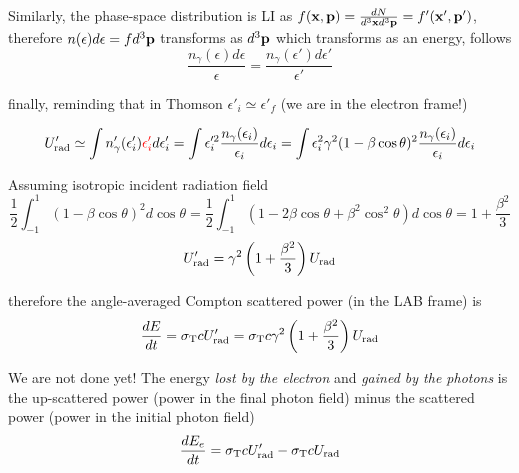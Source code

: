 
Similarly, the phase-space distribution is LI as $f (\vb x, \vb p) = \frac{dN}{d^3\vb x d^3 \vb p} = f'(\vb x', \vb p')$, therefore $n(\epsilon) d\epsilon = f d^3 \vb p$ transforms as $d^3 \vb p$ which transforms as an energy, follows
%
\begin{equation*}
\frac{n_\gamma(\epsilon) d\epsilon}{\epsilon} = \frac{n_\gamma(\epsilon') d\epsilon'}{\epsilon'}
\end{equation*}

finally, reminding that in Thomson $\epsilon'_i \simeq \epsilon'_f$ (we are in the electron frame!)

\begin{equation*}
U'_{\rm rad} 
\simeq \int n^\prime_\gamma(\epsilon^\prime_i) {\color{red}\epsilon^\prime_i}  d\epsilon^\prime_i 
= \int \epsilon_i^{\prime 2} \frac{n_\gamma(\epsilon_i)}{\epsilon_i} d\epsilon_i 
= \int \epsilon_i^2 \gamma^2 (1-\beta\cos\theta)^2 \frac{n_\gamma(\epsilon_i)}{\epsilon_i} d\epsilon_i 
\end{equation*}

Assuming isotropic incident radiation field
%
\begin{equation*}
\frac{1}{2} \int_{-1}^{1} (1-\beta \cos \theta)^2 d\cos\theta = \frac{1}{2} \int_{-1}^{1} (1-2\beta\cos\theta + \beta^2\cos^2\theta) d\cos\theta = 1 + \frac{\beta^2}{3}
\end{equation*}
%
\begin{equation*}
U'_{\rm rad} = \gamma^2 \left(1 + \frac{\beta^2}{3}\right) U_{\rm rad}
\end{equation*}

therefore the angle-averaged Compton scattered power (in the LAB frame) is
%
\begin{equation*}
\frac{dE}{dt} = \sigma_{\rm T} c U'_{\rm rad} = \sigma_{\rm T} c \gamma^2 \left( 1 + \frac{\beta^2}{3} \right) U_{\rm rad} 
\end{equation*}

We are not done yet! The energy \emph{lost by the electron} and \emph{gained by the photons} is the up-scattered power (power in the final photon field) minus the scattered power (power in the initial photon field)
%
\begin{equation*}
\frac{dE_e}{dt} 
= \sigma_{\rm T} c U'_{\rm rad} - \sigma_{\rm T} c U_{\rm rad}
\end{equation*}

